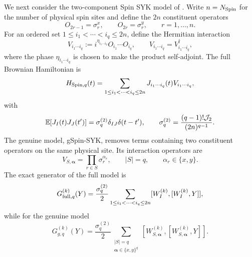 \documentclass{article}
\theoremstyle{definition}
\begin{document}
We next consider the two-component Spin SYK model of
\cite{xu2025dynamics}.  Write $n=N_{\rm Spin}$ for the number of physical
spin sites and define the $2n$ constituent operators
\begin{equation}
    O_{2r-1}=\sigma_r^x,
    \qquad
    O_{2r}=\sigma_r^y,
    \qquad
    r=1,\ldots,n.
\end{equation}
For an ordered set $1\le i_1<\cdots<i_q\le2n$, define the Hermitian
interaction
\begin{equation}
    V_{i_1\cdots i_q}
    :=i^{\eta_{i_1\cdots i_q}}
      O_{i_1}\cdots O_{i_q},
    \qquad
    V_{i_1\cdots i_q}=V_{i_1\cdots i_q}^\dagger,
\end{equation}
where the phase $\eta_{i_1\cdots i_q}$ is chosen to make the product
self-adjoint.  The full Brownian Hamiltonian is
\begin{equation}
    H_{{\rm Spin},q}(t)
    =\sum_{1\le i_1<\cdots<i_q\le2n}
    J_{i_1\cdots i_q}(t)V_{i_1\cdots i_q},
\end{equation}
with
\begin{equation}
    \mathbb E[J_I(t)J_J(t')]
    =\sigma_q^{(2)}\delta_{IJ}\delta(t-t'),
    \qquad
    \sigma_q^{(2)}
    =\frac{(q-1)!{\cal J}_2}{(2n)^{q-1}}.
\end{equation}
The genuine model, gSpin-SYK, removes terms containing two constituent
operators on the same physical site.  Its interaction operators are
\begin{equation}
    V_{S,\boldsymbol\alpha}
    =\prod_{r\in S}\sigma_r^{\alpha_r},
    \qquad
    |S|=q,
    \qquad
    \alpha_r\in\{x,y\}.
\end{equation}
The exact generator of the full model is
\begin{equation}
    G_{{\rm full},q}^{(k)}(Y)
    =\frac{\sigma_q^{(2)}}2
      \sum_{1\le i_1<\cdots<i_q\le2n}
      [W_I^{(k)},[W_I^{(k)},Y]],
\end{equation}
while for the genuine model
\begin{equation}
    G_{g,q}^{(k)}(Y)
    =\frac{\sigma_q^{(2)}}2
      \sum_{\substack{|S|=q\\
                      \boldsymbol\alpha\in\{x,y\}^q}}
      [W_{S,\boldsymbol\alpha}^{(k)},
       [W_{S,\boldsymbol\alpha}^{(k)},Y]].
\end{equation}
\end{document}
